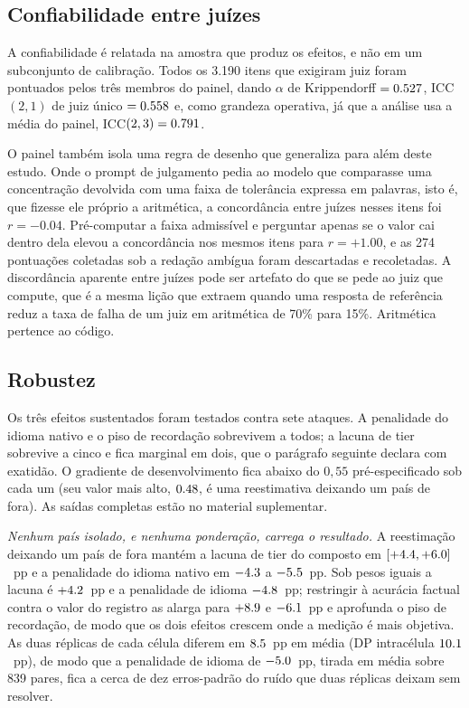 \subsection{Confiabilidade entre juízes}
\label{sec:res:confiab}

A confiabilidade é relatada na amostra que produz os efeitos, e não em um
subconjunto de calibração. Todos os 3.190 itens que exigiram juiz foram
pontuados pelos três membros do painel, dando $\alpha$ de Krippendorff
$=0.527$, ICC$(2,1)$ de juiz único $=0.558$ e, como grandeza operativa, já
que a análise usa a média do painel, ICC$(2,3)=0.791$.

O painel também isola uma regra de desenho que generaliza para além deste
estudo. Onde o prompt de julgamento pedia ao modelo que comparasse uma
concentração devolvida com uma faixa de tolerância expressa em palavras, isto
é, que fizesse ele próprio a aritmética, a concordância entre juízes nesses
itens foi $r=-0.04$. Pré-computar a faixa admissível e perguntar apenas se o
valor cai dentro dela elevou a concordância nos mesmos itens para $r=+1.00$, e
as 274 pontuações coletadas sob a redação ambígua foram descartadas e
recoletadas. A discordância aparente entre juízes pode ser artefato do que se
pede ao juiz que compute, que é a mesma lição que \citet{zheng2023judging}
extraem quando uma resposta de referência reduz a taxa de falha de um juiz em
aritmética de 70\% para 15\%. Aritmética pertence ao código.

\subsection{Robustez}
\label{sec:res:robustez}

Os três efeitos sustentados foram testados contra sete ataques. A penalidade do
idioma nativo e o piso de recordação sobrevivem a todos; a lacuna de tier
sobrevive a cinco e fica marginal em dois, que o parágrafo seguinte declara com
exatidão. O gradiente de desenvolvimento fica abaixo do $0,55$ pré-especificado
sob cada um (seu valor mais alto, $0.48$, é uma reestimativa deixando
um país de fora). As saídas completas estão no material suplementar.

\emph{Nenhum país isolado, e nenhuma ponderação, carrega o resultado.} A
reestimação deixando um país de fora mantém a lacuna de tier do composto em
$[+4.4,+6.0]$~pp e a penalidade do idioma nativo em $-4.3$
a $-5.5$~pp. Sob pesos iguais a lacuna é $+4.2$~pp e a penalidade de
idioma $-4.8$~pp; restringir à acurácia factual contra o valor do
registro as alarga para $+8.9$ e $-6.1$~pp e aprofunda o
piso de recordação, de modo que os dois efeitos crescem onde a medição é mais
objetiva. As duas réplicas de cada célula diferem em $8.5$~pp em média
(DP intracélula $10.1$~pp), de modo que a penalidade de idioma de
$-5.0$~pp, tirada em média sobre 839 pares, fica a cerca de dez
erros-padrão do ruído que duas réplicas deixam sem resolver.

